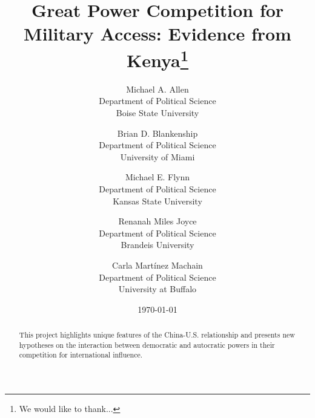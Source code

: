 \documentclass[12pt]{article}
\begin{document}
\author{Michael A. Allen \\ Department of Political Science \\ Boise State University \and Brian D. Blankenship \\Department of Political Science\\University of Miami \and Michael E. Flynn \\ Department of Political Science \\ Kansas State University \and Renanah Miles Joyce \\ Department of Political Science \\ Brandeis University \and Carla Mart\'{i}nez Machain \\ Department of Political Science \\ University at Buffalo}
\title{Great Power Competition for Military Access: Evidence from Kenya\footnote{We would like to thank...}}

\date{\vspace{2em}\today \vspace{1em}}

\maketitle

\thispagestyle{empty}

\clearpage

\begin{abstract}
\noindent 

This project highlights unique features of the China-U.S. relationship and presents new hypotheses on the interaction between democratic and autocratic powers in their competition for international influence.
\end{abstract}




	\vfill
	
	\thispagestyle{empty}
	
	
	\newpage
\setcounter{page}{1}

\doublespacing
	
	
	
	
	

\newpage



\end{document}
